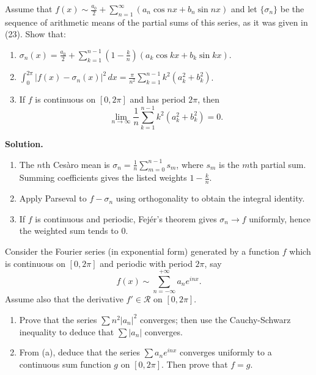 \begin{problembox}
Assume that $f(x) \sim \frac{a_0}{2} + \sum_{n=1}^\infty (a_n \cos nx + b_n \sin nx)$ and let $\{\sigma_n\}$ be the sequence of arithmetic means of the partial sums of this series, as it was given in (23). Show that:
\begin{enumerate}[label=(\alph*)]
\item $\sigma_n(x) = \frac{a_0}{2} + \sum_{k=1}^{n-1} \left(1 - \frac{k}{n}\right) (a_k \cos kx + b_k \sin kx)$.
\item $\int_0^{2\pi} |f(x) - \sigma_n(x)|^2 \, dx = \frac{\pi}{n^2} \sum_{k=1}^{n-1} k^2 (a_k^2 + b_k^2)$.
\item If $f$ is continuous on $[0, 2\pi]$ and has period $2\pi$, then
\[
\lim_{n \to \infty} \frac{1}{n} \sum_{k=1}^{n-1} k^2 (a_k^2 + b_k^2) = 0.
\]
\end{enumerate}
\end{problembox}

\noindent\textbf{Solution.}
\begin{enumerate}[label=(\alph*)]
\item The $n$th Cesàro mean is $\sigma_n=\tfrac{1}{n}\sum_{m=0}^{n-1} s_m$, where $s_m$ is the $m$th partial sum. Summing coefficients gives the listed weights $1-\tfrac{k}{n}$.
\item Apply Parseval to $f-\sigma_n$ using orthogonality to obtain the integral identity.
\item If $f$ is continuous and periodic, Fejér's theorem gives $\sigma_n\to f$ uniformly, hence the weighted sum tends to $0$.
\end{enumerate}

\begin{problembox}
Consider the Fourier series (in exponential form) generated by a function $f$ which is continuous on $[0, 2\pi]$ and periodic with period $2\pi$, say
\[
f(x) \sim \sum_{n=-\infty}^{+\infty} a_n e^{inx}.
\]
Assume also that the derivative $f' \in \mathcal{R}$ on $[0, 2\pi]$. 
\begin{enumerate}[label=(\alph*)]
\item Prove that the series $\sum n^2 |a_n|^2$ converges; then use the Cauchy-Schwarz inequality to deduce that $\sum |a_n|$ converges.
\item From (a), deduce that the series $\sum a_n e^{inx}$ converges uniformly to a continuous sum function $g$ on $[0, 2\pi]$. Then prove that $f = g$.
\end{enumerate}
\end{problembox}

